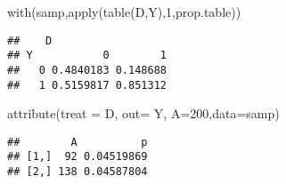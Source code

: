 \documentclass[
]{article}
\newenvironment{Shaded}{\begin{snugshade}}{\end{snugshade}}
\newcommand{\AttributeTok}[1]{\textcolor[rgb]{0.77,0.63,0.00}{#1}}
\newcommand{\DecValTok}[1]{\textcolor[rgb]{0.00,0.00,0.81}{#1}}
\newcommand{\FunctionTok}[1]{\textcolor[rgb]{0.00,0.00,0.00}{#1}}
\newcommand{\NormalTok}[1]{#1}
\begin{document}
\begin{Shaded}
\begin{Highlighting}[]
\FunctionTok{with}\NormalTok{(samp,}\FunctionTok{apply}\NormalTok{(}\FunctionTok{table}\NormalTok{(D,Y),}\DecValTok{1}\NormalTok{,prop.table)) }
\end{Highlighting}
\end{Shaded}

\begin{verbatim}
##    D
## Y           0        1
##   0 0.4840183 0.148688
##   1 0.5159817 0.851312
\end{verbatim}

\begin{Shaded}
\begin{Highlighting}[]
\FunctionTok{attribute}\NormalTok{(}\AttributeTok{treat =}\NormalTok{ D, }\AttributeTok{out=}\NormalTok{ Y, }\AttributeTok{A=}\DecValTok{200}\NormalTok{,}\AttributeTok{data=}\NormalTok{samp) }
\end{Highlighting}
\end{Shaded}

\begin{verbatim}
##        A          p
## [1,]  92 0.04519869
## [2,] 138 0.04587804
\end{verbatim}
\end{document}
